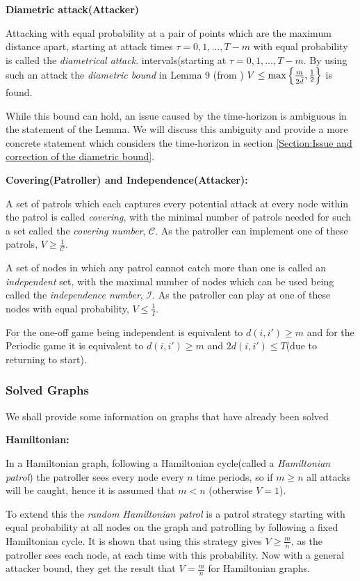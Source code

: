 \documentclass[a4paper,10pt]{article}
\theoremstyle{definition}
\theoremstyle{definition}
\theoremstyle{remark}
\theoremstyle{definition}
\begin{document}
\textbf{Diametric attack(Attacker)}

Attacking with equal probability at a pair of points which are the maximum distance apart, starting at attack times $\tau=0,1,...,T-m$ with equal probability is called the \textit{diametrical attack}. intervals(starting at $\tau=0,1,...,T-m$. By using such an attack the \textit{diametric bound} in Lemma 9 (from \cite{Alpern2011}) $V \leq \max\left\{\frac{m}{\raisebox{-0.5ex}{$\scriptstyle 2 \bar{d}$}} , \frac{1}{2} \right\}$ is found.


While this bound can hold, an issue caused by the time-horizon is ambiguous in the statement of the Lemma. We will discuss this ambiguity and provide a more concrete statement which considers the time-horizon in section \ref{Section:Issue and correction of the diametric bound}.

\textbf{Covering(Patroller) and Independence(Attacker):}

A set of patrols which each captures every potential attack at every node within the patrol is called  \textit{covering}, with the minimal number of patrols needed for such a set called the \textit{covering number}, $\mathcal{C}$. As the patroller can implement one of these patrols, $V \geq \frac{1}{\mathcal{C}}$.

A set of nodes in which any patrol cannot catch more than one is called  an \textit{independent} set, with the maximal number of nodes which can be used being called the \textit{independence number}, $\mathcal{I}$. As the patroller can play at one of these nodes with equal probability, $V \leq \frac{1}{I}$. 


For the one-off game being independent is equivalent to $d(i,i') \geq m$ and for the Periodic game it is equivalent to $d(i,i') \geq m$ and $2d(i,i') \leq T$(due to returning to start).

\subsubsection{Solved Graphs}
We shall provide some information on graphs that have already been solved

\textbf{Hamiltonian:}

In a Hamiltonian graph, following a Hamiltonian cycle(called a \textit{Hamiltonian patrol}) the patroller sees every node every $n$ time periods, so if $m \geq n$ all attacks will be caught, hence it is assumed that $m < n$ (otherwise $V=1$).

To extend this the \textit{random Hamiltonian patrol} is a patrol strategy starting with equal probability at all nodes on the graph and patrolling by following a fixed Hamiltonian cycle. It is shown that using this strategy gives $V \geq \frac{m}{n}$, as the patroller sees each node, at each time with this probability. Now with a general attacker bound, they get the result that $V=\frac{m}{n}$ for Hamiltonian graphs.
\end{document}

